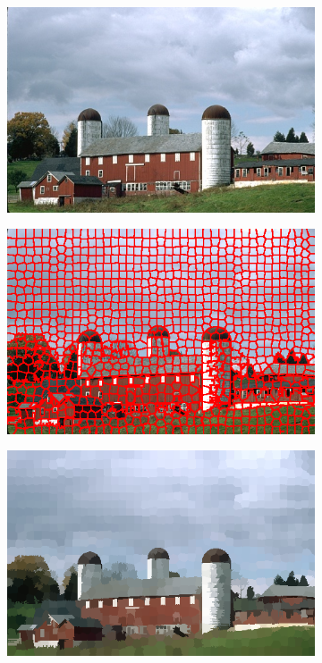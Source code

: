 \documentclass[12pt,a4paper,oneside]{article}
\begin{document}
\begin{figure}[!htb]	
	\centering
	\begin{subfigure}[t]{.325\textwidth}
		\includegraphics[width=\textwidth]{resources/images/es1_superpixel_originale.png}	
	\end{subfigure}%
	\hfill
	\begin{subfigure}[t]{.325\textwidth}
		\includegraphics[width=\textwidth]{resources/images/es1_superpixel_contorni.png}
	\end{subfigure}%
	\hfill
	\begin{subfigure}[t]{.325\textwidth}
		\label{es_superpixel_superpixel}
		\includegraphics[width=\textwidth]{resources/images/es1_superpixel_superpixel.png}

\end{subfigure}
\end{figure}
\end{document}
